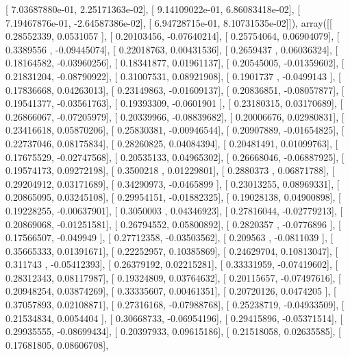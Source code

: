 \documentclass{article}
\begin{document}
       [  7.03687880e-01,   2.25171363e-02],
       [  9.14109022e-01,   6.86083418e-02],
       [  7.19467876e-01,  -2.64587386e-02],
       [  6.94728715e-01,   8.10731535e-02]]), array([[ 0.28552339,  0.0531057 ],
       [ 0.20103456, -0.07640214],
       [ 0.25754064,  0.06904079],
       [ 0.3389556 , -0.09445074],
       [ 0.22018763,  0.00431536],
       [ 0.2659437 ,  0.06036324],
       [ 0.18164582, -0.03960256],
       [ 0.18341877,  0.01961137],
       [ 0.20545005, -0.01359602],
       [ 0.21831204, -0.08790922],
       [ 0.31007531,  0.08921908],
       [ 0.1901737 , -0.0499143 ],
       [ 0.17836668,  0.04263013],
       [ 0.23149863, -0.01609137],
       [ 0.20836851, -0.08057877],
       [ 0.19541377, -0.03561763],
       [ 0.19393309, -0.0601901 ],
       [ 0.23180315,  0.03170689],
       [ 0.26866067, -0.07205979],
       [ 0.20339966, -0.08839682],
       [ 0.20006676,  0.02980831],
       [ 0.23416618,  0.05870206],
       [ 0.25830381, -0.00946544],
       [ 0.20907889, -0.01654825],
       [ 0.22737046,  0.08175834],
       [ 0.28260825,  0.04084394],
       [ 0.20481491,  0.01099763],
       [ 0.17675529, -0.02747568],
       [ 0.20535133,  0.04965302],
       [ 0.26668046, -0.06887925],
       [ 0.19574173,  0.09272198],
       [ 0.3500218 ,  0.01229801],
       [ 0.2880373 ,  0.06871788],
       [ 0.29204912,  0.03171689],
       [ 0.34290973, -0.0465899 ],
       [ 0.23013255,  0.08969331],
       [ 0.20865095,  0.03245108],
       [ 0.29954151, -0.01882325],
       [ 0.19028138,  0.04900898],
       [ 0.19228255, -0.00637901],
       [ 0.3050003 ,  0.04346923],
       [ 0.27816044, -0.02779213],
       [ 0.20869068, -0.01251581],
       [ 0.26794552,  0.05800892],
       [ 0.2820357 , -0.0776896 ],
       [ 0.17566507, -0.049949  ],
       [ 0.27712358, -0.03503562],
       [ 0.209563  , -0.0811039 ],
       [ 0.35665333,  0.01391671],
       [ 0.22252957,  0.10385869],
       [ 0.24629704,  0.10813047],
       [ 0.311743  , -0.05412393],
       [ 0.26379192,  0.02215281],
       [ 0.33331959, -0.07419602],
       [ 0.28312343,  0.08117987],
       [ 0.19324809,  0.03764632],
       [ 0.20115657, -0.07497616],
       [ 0.20948254,  0.03874269],
       [ 0.33335607,  0.00461351],
       [ 0.20720126,  0.0474205 ],
       [ 0.37057893,  0.02108871],
       [ 0.27316168, -0.07988768],
       [ 0.25238719, -0.04933509],
       [ 0.21534834,  0.0054404 ],
       [ 0.30668733, -0.06954196],
       [ 0.29415896, -0.05371514],
       [ 0.29935555, -0.08699434],
       [ 0.20397933,  0.09615186],
       [ 0.21518058,  0.02635585],
       [ 0.17681805,  0.08606708],
\end{document}
